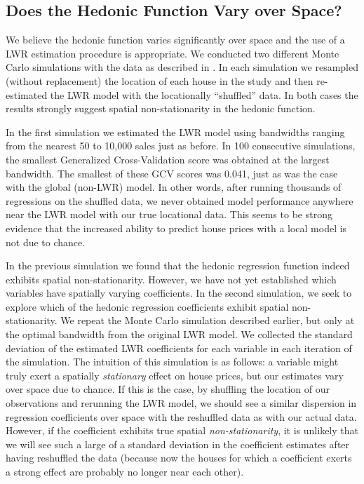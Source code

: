 \documentclass{article}\usepackage{graphicx, color}
\begin{document}
\subsection{Does the Hedonic Function Vary over Space?}
We believe the hedonic function varies significantly over space and the use of a LWR estimation procedure is appropriate. We conducted two different Monte Carlo simulations with the data as described in \citet{Fotheringham2002}. In each simulation we resampled (without replacement) the location of each house in the study and then re-estimated the LWR model with the locationally ``shuffled'' data. In both cases the results strongly suggest spatial non-stationarity in the hedonic function. 

In the first simulation we estimated the LWR model using bandwidths ranging from the nearest 50 to 10,000 sales just as before. In 100 consecutive simulations, the smallest Generalized Cross-Validation score was obtained at the largest bandwidth. The smallest of these GCV scores was 0.041, just as was the case with the global (non-LWR) model. In other words, after running thousands of regressions on the shuffled data, we never obtained model performance anywhere near the LWR model with our true locational data. This seems to be strong evidence that the increased ability to predict house prices with a local model is not due to chance. 

In the previous simulation we found that the hedonic regression function indeed exhibits spatial non-stationarity. However, we have not yet established which variables have spatially varying coefficients. In the second simulation, we seek to explore which of the hedonic regression coefficients exhibit spatial non-stationarity. We repeat the Monte Carlo simulation described earlier, but only at the optimal bandwidth from the original LWR model. We collected the standard deviation of the estimated LWR coefficients for each variable in each iteration of the simulation. The intuition of this simulation is as follows: a variable might truly exert a spatially \emph{stationary} effect on house prices, but our estimates vary over space due to chance. If this is the case, by shuffling the location of our observations and rerunning the LWR model, we should see a similar dispersion in regression coefficients over space with the reshuffled data as with our actual data. However, if the coefficient exhibits true spatial \emph{non-stationarity}, it is unlikely that we will see such a large of a standard deviation in the coefficient estimates after having reshuffled the data (because now the houses for which a coefficient exerts a strong effect are probably no longer near each other). 
\end{document}
